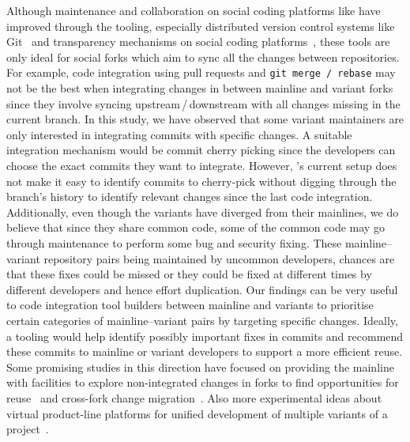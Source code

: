Although maintenance and collaboration on social coding platforms like \gh have improved through the tooling, especially distributed version
control systems like Git~\cite{Christian:MSR:2012} and transparency mechanisms on social coding platforms~\cite{Laura:2012:CSCW}, these tools are only ideal for social forks which aim to sync all the changes between repositories.
For example, code integration using pull requests and \texttt{git merge\,/\,rebase} may not be the best when integrating changes in between mainline and variant forks since they involve syncing upstream\,/\,downstream with all changes missing in the current branch.
In this study, we have observed that some variant maintainers are only interested in integrating commits with specific changes.
A suitable integration mechanism would be commit cherry picking since the developers can choose the exact commits they want to integrate.
However, \gh's current setup does not make it easy to identify commits to cherry-pick without digging through the branch's history to identify relevant changes since the last code integration.
Additionally, even though the variants have diverged from their mainlines, we do believe that since they share common code, some of the common code may go through maintenance to perform some bug and security fixing. These mainline--variant repository pairs being maintained by uncommon developers, chances are that these fixes could be missed or they could be fixed at different times by different developers and hence effort duplication.
Our findings can be very useful to code integration tool builders between mainline and variants to prioritise certain categories of mainline--variant pairs by targeting specific changes.
Ideally, a tooling would help identify possibly important fixes in commits and recommend these commits to mainline or variant developers to support a more efficient reuse.
Some promising studies in this direction have focused on providing the mainline with facilities to explore non-integrated changes in forks to find opportunities for reuse~\cite{Ren:2018} and cross-fork change migration~\cite{Ren:2019}. Also more experimental ideas about virtual product-line platforms for unified development of multiple variants of a project~\cite{Antkiewicz:icse:2014,Fischer:saner:2014,Montalvillo:spl:2015,rubin:icse:2013,Stefan:2016:icsme}.

